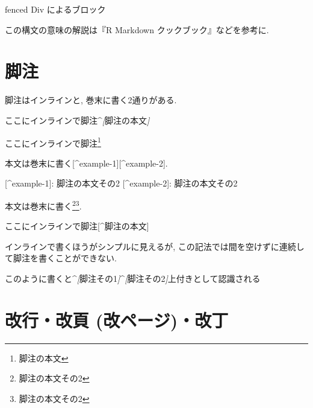 \documentclass[
  xelatex,ja=standard,jafont=noto]{bxjsbook}
\newenvironment{Shaded}{\begin{snugshade}}{\end{snugshade}}
\newcommand{\CommentTok}[1]{\textcolor[rgb]{0.56,0.35,0.01}{\textit{#1}}}
\newcommand{\NormalTok}[1]{#1}
\newcommand{\OtherTok}[1]{\textcolor[rgb]{0.56,0.35,0.01}{#1}}
\newenvironment{infobox}[1]{\begin{itemize}\renewcommand{\labelitemi}{\raisebox{-.7\height}[0pt][0pt]{%
  {\setkeys{Gin}{width=3em,keepaspectratio}\texttt{[image: \_latex/\_img/\#1]}}}}
  \setlength{\fboxsep}{1em}
  \begin{greyblock}
  \item
  }{\end{greyblock}\end{itemize}
}
\theoremstyle{definition}
\theoremstyle{definition}
\theoremstyle{definition}
\theoremstyle{definition}
\theoremstyle{remark}
\begin{document}
\begin{infobox}{warning}
fenced Div によるブロック

\end{infobox}

この構文の意味の解説は『R Markdown クックブック』などを参考に.

\hypertarget{ux811aux6ce8}{%
\section{脚注}\label{ux811aux6ce8}}

脚注はインラインと, 巻末に書く2通りがある.

\begin{Shaded}
\begin{Highlighting}[]
\NormalTok{ここにインラインで脚注\^{}}\CommentTok{[}\OtherTok{脚注の本文}\CommentTok{]}
\end{Highlighting}
\end{Shaded}

ここにインラインで脚注\footnote{脚注の本文}

\begin{Shaded}
\begin{Highlighting}[]
\NormalTok{本文は巻末に書く}\OtherTok{[\^{}example{-}1][\^{}example{-}2]}\NormalTok{.}

\OtherTok{[\^{}example{-}1]: }\NormalTok{脚注の本文その2}
\OtherTok{[\^{}example{-}2]: }\NormalTok{脚注の本文その2}
\end{Highlighting}
\end{Shaded}

本文は巻末に書く\footnote{脚注の本文その2}\footnote{脚注の本文その2}.

ここにインラインで脚注{[}\^{}脚注の本文{]}

インラインで書くほうがシンプルに見えるが,
この記法では間を空けずに連続して脚注を書くことができない.

\begin{Shaded}
\begin{Highlighting}[]
\NormalTok{このように書くと\^{}}\CommentTok{[}\OtherTok{脚注その1}\CommentTok{]}\NormalTok{\^{}}\CommentTok{[}\OtherTok{脚注その2}\CommentTok{]}\NormalTok{上付きとして認識される}
\end{Highlighting}
\end{Shaded}

\hypertarget{ux6539ux884cux6539ux9801-ux6539ux30daux30fcux30b8ux6539ux4e01}{%
\section{改行・改頁
(改ページ)・改丁}\label{ux6539ux884cux6539ux9801-ux6539ux30daux30fcux30b8ux6539ux4e01}}
\end{document}
